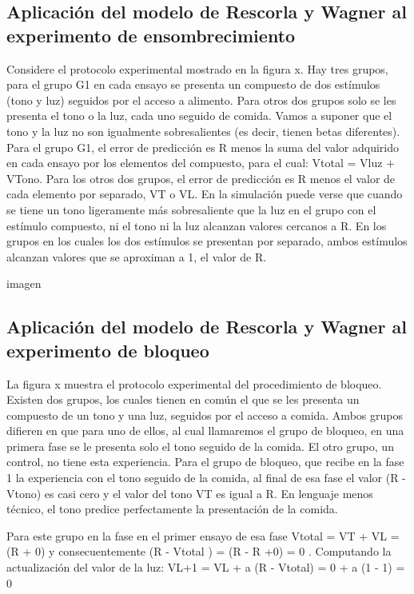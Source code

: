 \documentclass[
  letterpaper,
]{book}
\begin{document}
\subsection{Aplicación del modelo de Rescorla y Wagner al experimento de
ensombrecimiento}\label{aplicaciuxf3n-del-modelo-de-rescorla-y-wagner-al-experimento-de-ensombrecimiento}

Considere el protocolo experimental mostrado en la figura x. Hay tres
grupos, para el grupo G1 en cada ensayo se presenta un compuesto de dos
estímulos (tono y luz) seguidos por el acceso a alimento. Para otros dos
grupos solo se les presenta el tono o la luz, cada uno seguido de
comida. Vamos a suponer que el tono y la luz no son igualmente
sobresalientes (es decir, tienen betas diferentes). Para el grupo G1, el
error de predicción es R menos la suma del valor adquirido en cada
ensayo por los elementos del compuesto, para el cual: Vtotal = Vluz +
VTono. Para los otros dos grupos, el error de predicción es R menos el
valor de cada elemento por separado, VT o VL. En la simulación puede
verse que cuando se tiene un tono ligeramente más sobresaliente que la
luz en el grupo con el estímulo compuesto, ni el tono ni la luz alcanzan
valores cercanos a R. En los grupos en los cuales los dos estímulos se
presentan por separado, ambos estímulos alcanzan valores que se
aproximan a 1, el valor de R.

imagen

\subsection{Aplicación del modelo de Rescorla y Wagner al experimento de
bloqueo}\label{aplicaciuxf3n-del-modelo-de-rescorla-y-wagner-al-experimento-de-bloqueo}

La figura x muestra el protocolo experimental del procedimiento de
bloqueo. Existen dos grupos, los cuales tienen en común el que se les
presenta un compuesto de un tono y una luz, seguidos por el acceso a
comida. Ambos grupos difieren en que para uno de ellos, al cual
llamaremos el grupo de bloqueo, en una primera fase se le presenta solo
el tono seguido de la comida. El otro grupo, un control, no tiene esta
experiencia. Para el grupo de bloqueo, que recibe en la fase 1 la
experiencia con el tono seguido de la comida, al final de esa fase el
valor (R - Vtono) es casi cero y el valor del tono VT es igual a R. En
lenguaje menos técnico, el tono predice perfectamente la presentación de
la comida.

Para este grupo en la fase en el primer ensayo de esa fase Vtotal = VT +
VL = (R + 0) y consecuentemente (R - Vtotal ) = (R - R +0) = 0 .
Computando la actualización del valor de la luz: VL+1 = VL + a (R -
Vtotal) = 0 + a (1 - 1) = 0
\end{document}
